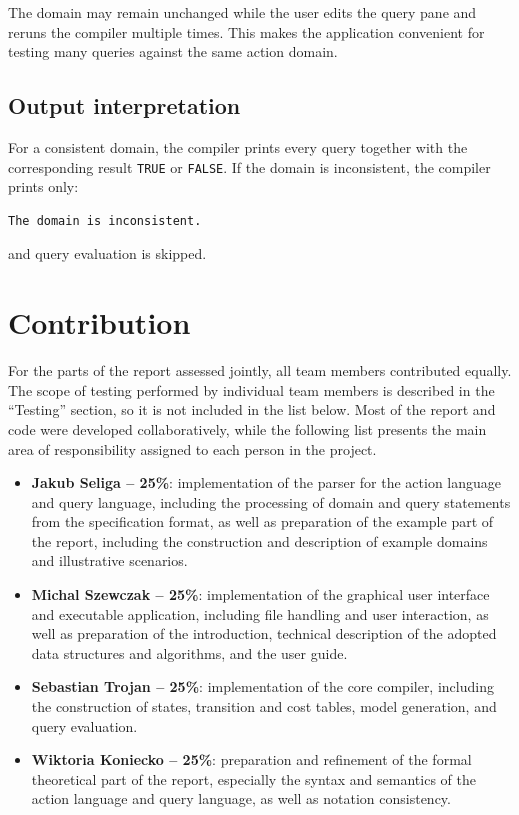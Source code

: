\documentclass[11pt]{article}
\begin{document}
The domain may remain unchanged while the user edits the query pane and reruns
the compiler multiple times. This makes the application convenient for testing
many queries against the same action domain.

\subsection{Output interpretation}
For a consistent domain, the compiler prints every query together with the
corresponding result \texttt{TRUE} or \texttt{FALSE}. If the domain is
inconsistent, the compiler prints only:
\begin{verbatim}
The domain is inconsistent.
\end{verbatim}
and query evaluation is skipped.


\section{Contribution}
For the parts of the report assessed jointly, all team members contributed equally.
The scope of testing performed by individual team members is described in the
``Testing'' section, so it is not included in the list below. Most of the report
and code were developed collaboratively, while the following list presents the
main area of responsibility assigned to each person in the project.

\begin{itemize}
    \item \textbf{Jakub Seliga -- 25\%}: implementation of the parser for the
    action language and query language, including the processing of domain and
    query statements from the specification format, as well as preparation of the
    example part of the report, including the construction and description of
    example domains and illustrative scenarios.
    \item \textbf{Michal Szewczak -- 25\%}: implementation of the graphical user
    interface and executable application, including file handling and user
    interaction, as well as preparation of the introduction, technical description
    of the adopted data structures and algorithms, and the user guide.
    \item \textbf{Sebastian Trojan -- 25\%}: implementation of the core compiler,
    including the construction of states, transition and cost tables, model
    generation, and query evaluation.
    \item \textbf{Wiktoria Koniecko -- 25\%}: preparation and refinement of the
    formal theoretical part of the report, especially the syntax and semantics of
    the action language and query language, as well as notation consistency.
\end{itemize}
\end{document}
